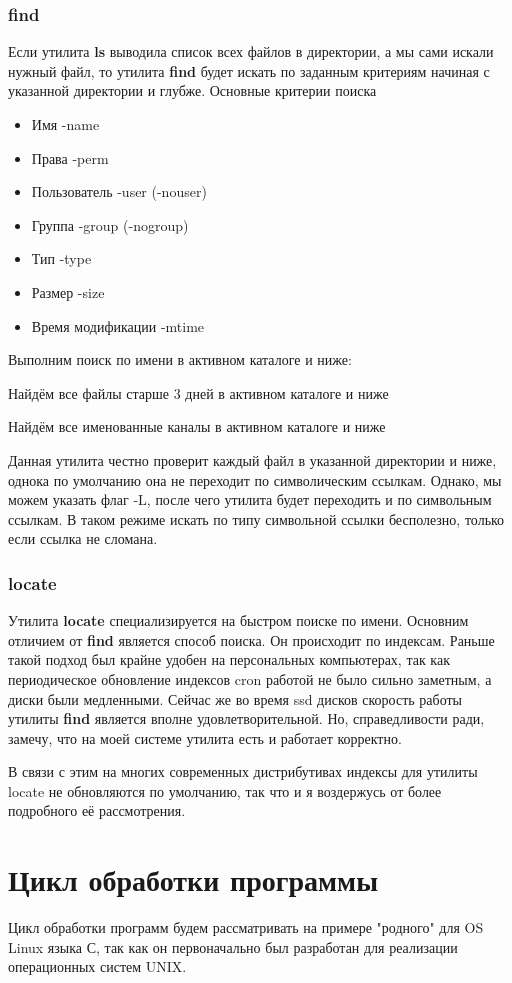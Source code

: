 \documentclass[a4paper]{article}
\begin{document}
\subsubsection{ find}
Если утилита \textbf{ls} выводила список всех файлов в директории, а мы сами искали нужный файл, то утилита \textbf{find} будет искать по заданным критериям начиная с указанной директории и глубже.
Основные критерии поиска
\begin{itemize}
\item Имя -name
\item Права -perm
\item Пользователь -user (-nouser)
\item Группа -group (-nogroup)
\item Тип -type
\item Размер -size
\item Время модификации -mtime
\end{itemize}
Выполним поиск по имени в активном каталоге и ниже:

Найдём все файлы старше 3 дней в активном каталоге и ниже

Найдём все именованные каналы в активном каталоге и ниже


Данная утилита честно проверит каждый файл в указанной директории и ниже, однока по умолчанию она не переходит по символическим ссылкам. Однако, мы можем указать флаг -L, после чего утилита будет переходить и по символьным ссылкам. В таком режиме искать по типу символьной ссылки бесполезно, только если ссылка не сломана. 

\subsubsection{ locate}
Утилита \textbf{locate} специализируется на быстром поиске по имени. Основним отличием от \textbf{find} является способ поиска. Он происходит по индексам. Раньше такой подход был крайне удобен на персональных компьютерах, так как периодическое обновление индексов cron работой не было сильно заметным, а диски были медленными. Сейчас же во время ssd дисков скорость работы утилиты \textbf{find} является вполне удовлетворительной. Но, справедливости ради, замечу, что на моей системе утилита есть и работает корректно.

В связи с этим на многих современных дистрибутивах индексы для утилиты locate не обновляются по умолчанию, так что и я воздержусь от более подробного её рассмотрения.
\section{Цикл обработки программы}
Цикл обработки программ будем рассматривать на примере "родного" для OS Linux языка С, так как он первоначально был разработан для реализации операционных систем UNIX.
\end{document}
